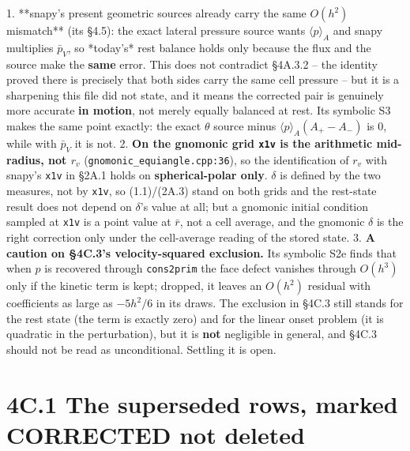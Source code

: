 \documentclass[11pt,a4paper]{article}
\begin{document}
1. **snapy's present geometric sources already carry the same $O(h^2)$
   mismatch** (its §4.5): the exact lateral pressure source wants
   $\langle p\rangle_A$ and snapy multiplies $\bar p_V$, so *today's* rest
   balance holds only because the flux and the source make the \textbf{same} error.
   This does not contradict §4A.3.2 -- the identity proved there is precisely
   that both sides carry the same cell pressure -- but it is a sharpening this
   file did not state, and it means the corrected pair is genuinely more
   accurate \textbf{in motion}, not merely equally balanced at rest. Its symbolic
   S3 makes the same point exactly: the exact $\theta$ source minus
   $\langle p\rangle_A(A_+-A_-)$ is $0$, while with $\bar p_V$ it is not.
2. \textbf{On the gnomonic grid \texttt{x1v} is the arithmetic mid-radius, not $r_v$}
   (\texttt{gnomonic\_equiangle.cpp:36}), so the identification of $r_v$ with snapy's
   \texttt{x1v} in §2A.1 holds on \textbf{spherical-polar only}. $\delta$ is defined by the
   two measures, not by \texttt{x1v}, so (1.1)/(2A.3) stand on both grids and the
   rest-state result does not depend on $\delta$'s value at all; but a gnomonic
   initial condition sampled at \texttt{x1v} is a point value at $\bar r$, not a cell
   average, and the gnomonic $\delta$ is the right correction only under the
   cell-average reading of the stored state.
3. \textbf{A caution on §4C.3's velocity-squared exclusion.} Its symbolic S2e finds
   that when $p$ is recovered through \texttt{cons2prim} the face defect vanishes
   through $O(h^3)$ only if the kinetic term is kept; dropped, it leaves an
   $O(h^2)$ residual with coefficients as large as $-5h^2/6$ in its draws. The
   exclusion in §4C.3 still stands for the rest state (the term is exactly
   zero) and for the linear onset problem (it is quadratic in the
   perturbation), but it is \textbf{not} negligible in general, and §4C.3 should not
   be read as unconditional. Settling it is open.

\section*{4C.1 The superseded rows, marked CORRECTED not deleted}
\end{document}
